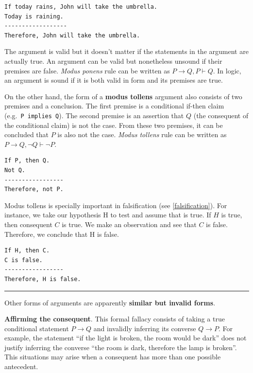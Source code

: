 \documentclass[
  12pt,
]{book}
\begin{document}
\begin{verbatim}
If today rains, John will take the umbrella.
Today is raining.
------------------
Therefore, John will take the umbrella.
\end{verbatim}

The argument is valid but it doesn't matter if the statements in the argument are actually true. An argument can be valid but nonetheless unsound if their premises are false. \emph{Modus ponens} rule can be written as \(P \rightarrow Q, P \vdash Q\). In logic, an argument is sound if it is both valid in form and its premises are true.

On the other hand, the form of a \textbf{modus tollens} argument also consists of two premises and a conclusion. The first premise is a conditional if-then claim (e.g.~\texttt{P\ implies\ Q}). The second premise is an assertion that \(Q\) (the consequent of the conditional claim) is not the case. From these two premises, it can be concluded that \(P\) is also not the case. \emph{Modus tollens} rule can be written as \(P \rightarrow Q, \lnot Q \vdash \lnot P\).

\begin{verbatim}
If P, then Q.
Not Q.
-----------------
Therefore, not P.
\end{verbatim}

Modus tollens is specially important in falsification (see \ref{falsification}). For instance, we take our hypothesis H to test and assume that is true. If \(H\) is true, then consequent \(C\) is true. We make an observation and see that \(C\) is false. Therefore, we conclude that H is false.

\begin{verbatim}
If H, then C.
C is false.
-----------------
Therefore, H is false.
\end{verbatim}

\begin{center}\rule{0.5\linewidth}{0.5pt}\end{center}

Other forms of arguments are apparently \textbf{similar but invalid forms}.

\textbf{Affirming the consequent}. This formal fallacy consists of taking a true conditional statement \(P \rightarrow Q\) and invalidly inferring its converse \(Q \rightarrow P\). For example, the statement ``if the light is broken, the room would be dark'' does not justify inferring the converse ``the room is dark, therefore the lamp is broken''. This situations may arise when a consequent has more than one possible antecedent.
\end{document}
